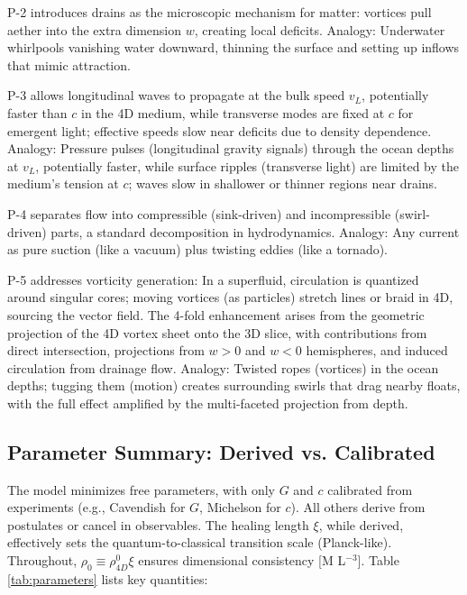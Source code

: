 \documentclass{article}
\begin{document}
P-2 introduces drains as the microscopic mechanism for matter: vortices pull aether into the extra dimension $w$, creating local deficits. Analogy: Underwater whirlpools vanishing water downward, thinning the surface and setting up inflows that mimic attraction.

P-3 allows longitudinal waves to propagate at the bulk speed $v_L$, potentially faster than $c$ in the 4D medium, while transverse modes are fixed at $c$ for emergent light; effective speeds slow near deficits due to density dependence. Analogy: Pressure pulses (longitudinal gravity signals) through the ocean depths at $v_L$, potentially faster, while surface ripples (transverse light) are limited by the medium's tension at $c$; waves slow in shallower or thinner regions near drains.

P-4 separates flow into compressible (sink-driven) and incompressible (swirl-driven) parts, a standard decomposition in hydrodynamics. Analogy: Any current as pure suction (like a vacuum) plus twisting eddies (like a tornado).

P-5 addresses vorticity generation: In a superfluid, circulation is quantized around singular cores; moving vortices (as particles) stretch lines or braid in 4D, sourcing the vector field. The 4-fold enhancement arises from the geometric projection of the 4D vortex sheet onto the 3D slice, with contributions from direct intersection, projections from $w>0$ and $w<0$ hemispheres, and induced circulation from drainage flow. Analogy: Twisted ropes (vortices) in the ocean depths; tugging them (motion) creates surrounding swirls that drag nearby floats, with the full effect amplified by the multi-faceted projection from depth.

\subsection{Parameter Summary: Derived vs. Calibrated}

The model minimizes free parameters, with only \(G\) and \(c\) calibrated from experiments (e.g., Cavendish for \(G\), Michelson for \(c\)). All others derive from postulates or cancel in observables. The healing length \(\xi\), while derived, effectively sets the quantum-to-classical transition scale (Planck-like). Throughout, $\rho_0 \equiv \rho_{4D}^0 \xi$ ensures dimensional consistency [M L$^{-3}$]. Table \ref{tab:parameters} lists key quantities:
\end{document}
